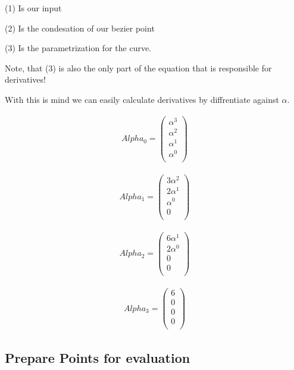 (1) Is our input

(2) Is the condesation of our bezier point

(3) Is the parametrization for the curve.

Note, that (3) is also the only part of the equation that is responsible for derivatives!

With this is mind we can easily calculate derivatives by diffrentiate against $\alpha$.

\begin{align}
    Alpha_0=\left(
    \begin{array}{cccc}
        \alpha ^3 \\
        \alpha ^2 \\
        \alpha ^1 \\
        \alpha ^0 \\
    \end{array}
    \right)
\end{align}

\begin{align}
    Alpha_1=\left(
    \begin{array}{cccc}
        3 \alpha ^2 \\
        2 \alpha ^1 \\
        \alpha ^0 \\
        0 \\
    \end{array}
    \right)
\end{align}

\begin{align}
    Alpha_2=\left(
    \begin{array}{cccc}
        6 \alpha ^1 \\
        2 \alpha ^0 \\
        0 \\
        0 \\
    \end{array}
    \right)
\end{align}

\begin{align}
    Alpha_3=\left(
    \begin{array}{cccc}
        6 \\
        0 \\
        0 \\
        0 \\
    \end{array}
    \right)
\end{align}

\subsection{Prepare Points for evaluation}

